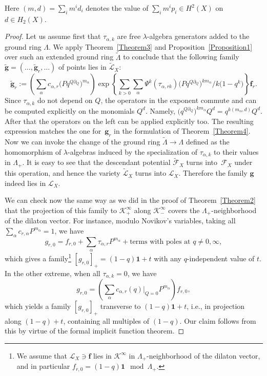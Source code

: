 \documentclass[pdftex]{sigma}
\def\F{\mathcal F}
\def\K{\mathcal K}
\def\L{\mathcal L}
\def\1{\mathbf 1}
\def\tilde{\widetilde}
\def\p{\partial}
\def\a{\alpha}
\def\f{{\mathbf f}}
\def\g{{\mathbf g}}
\begin{document}
Here $(m, d)=\sum_i m^id_i$ denotes the value of $\sum_i m^i p_i \in H^2(X)$ on
$d\in H_2(X)$.

\begin{proof} Let us assume first that $\tau_{\a,k}$ are free $\lambda$-algebra generators added to the ground ring $\Lambda$. We apply Theorem~\ref{Theorem3} and Proposition~\ref{Proposition1} over such an extended ground ring $\tilde{\Lambda}$ to conclude that the following family $\tilde{\g} = (\dots, \tilde{\g}_r,\dots)$ of points
lies in $\tilde{\L}_X$:
\[ \tilde{\g}_r:=\left(\sum_\a c_{\a,r}\big(Pq^{Q\p_Q}\big)^{m_\a}\right)
\exp\left\{\sum_{k>0} \sum_\a \Psi^k(\tau_{\a,rk}) \big(Pq^{Q\p_Q}\big)^{km_\a}/k\big(1-q^k\big)\right\} \f_r.\]
Since $\tau_{\a,k}$ do not depend on $Q$, the operators in the exponent commute
and can be computed explicitly on the monomials $Q^d$. Namely, $\big(q^{Q\p_Q}\big)^{km_{\a}}Q^d =
q^{k(m_\a,d)}Q^d$. After that the operators on the left can be applied explicitly
too. The resulting expression matches the one for~$\g_r$ in the formulation of Theorem~\ref{Theorem4}. Now we can invoke the change of the ground ring $\tilde{\Lambda}\to \Lambda$ defined as the homomorphism of $\lambda$-algebras induced by the specialization of $\tau_{\a,k}$ to their values in $\Lambda_{+}$. It is easy to see that the descendant potential $\tilde{\F}_X$ turns into~$\F_X$ under this operation, and hence the variety $\tilde{\L}_X$ turns into $\L_X$. Therefore the family $\g$ indeed lies in $\L_X$.

We can check now the same way as we did in the proof of Theorem~\ref{Theorem2} that the projection of this family to $\K_{+}^{\infty}$ along $\K_{-}^{\infty}$ covers the $\Lambda_{+}$-neighborhood of the dilaton vector. For instance, modulo Novikov's variables, taking all $\sum_\a c_{r,\a} P^{m_{\a}} =1$, we have
\[ g_{r,0}=f_{r,0}+\sum_{\a} \tau_{\a,r} P^{m_{\a}} + \text{terms with poles at $q\neq 0,\infty$}, \]
 which gives a family\footnote{We assume that $\L_X\ni \f$ lies in $\K^{\infty}$ in $\Lambda_{+}$-neighborhood of the dilaton vector, and in particular $f_{r,0}=(1-q)\1 \mod \Lambda_{+}$.} $[g_{r,0}]_{+}=(1-q)\1+t$ with any $q$-independent value of $t$. In the other extreme, when all $\tau_{\a,k}=0$,
we have
\[ g_{r,0} = \left(\sum_\a c_{\a,r}(q)|_{Q=0} P^{m_{\a}}\right) f_{r,0},\]
which yields a family $[g_{r,0}]_{+}$ transverse to $(1-q)\1+t$, i.e., in projection along $(1-q)+t$, containing all multiples of $(1-q)$. Our claim follows from this by virtue of the formal implicit function theorem. \end{proof}
\end{document}

